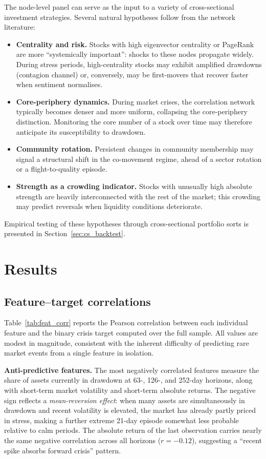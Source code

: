 \documentclass{article}
\begin{document}
The node-level panel can serve as the input to a variety of cross-sectional investment strategies. Several natural hypotheses follow from the network literature:

\begin{itemize}
    \item \textbf{Centrality and risk.} Stocks with high eigenvector centrality or PageRank are more ``systemically important'': shocks to these nodes propagate widely. During stress periods, high-centrality stocks may exhibit amplified drawdowns (contagion channel) or, conversely, may be first-movers that recover faster when sentiment normalises.
    \item \textbf{Core-periphery dynamics.} During market crises, the correlation network typically becomes denser and more uniform, collapsing the core-periphery distinction. Monitoring the core number of a stock over time may therefore anticipate its susceptibility to drawdown.
    \item \textbf{Community rotation.} Persistent changes in community membership may signal a structural shift in the co-movement regime, ahead of a sector rotation or a flight-to-quality episode.
    \item \textbf{Strength as a crowding indicator.} Stocks with unusually high absolute strength are heavily interconnected with the rest of the market; this crowding may predict reversals when liquidity conditions deteriorate.
\end{itemize}

Empirical testing of these hypotheses through cross-sectional portfolio sorts is presented in Section~\ref{sec:cs_backtest}.


\section{Results}
\label{sec:results}

\subsection{Feature--target correlations}
\label{sec:feature_corr}

Table~\ref{tab:feat_corr} reports the Pearson correlation between each individual feature and the binary crisis target computed over the full sample. All values are modest in magnitude, consistent with the inherent difficulty of predicting rare market events from a single feature in isolation.

\textbf{Anti-predictive features.} The most negatively correlated features measure the share of assets currently in drawdown at 63-, 126-, and 252-day horizons, along with short-term market volatility and short-term absolute returns. The negative sign reflects a \emph{mean-reversion effect}: when many assets are simultaneously in drawdown and recent volatility is elevated, the market has already partly priced in stress, making a further extreme 21-day episode somewhat less probable relative to calm periods. The absolute return of the last observation carries nearly the same negative correlation across all horizons ($r = -0.12$), suggesting a ``recent spike absorbs forward crisis'' pattern.
\end{document}

